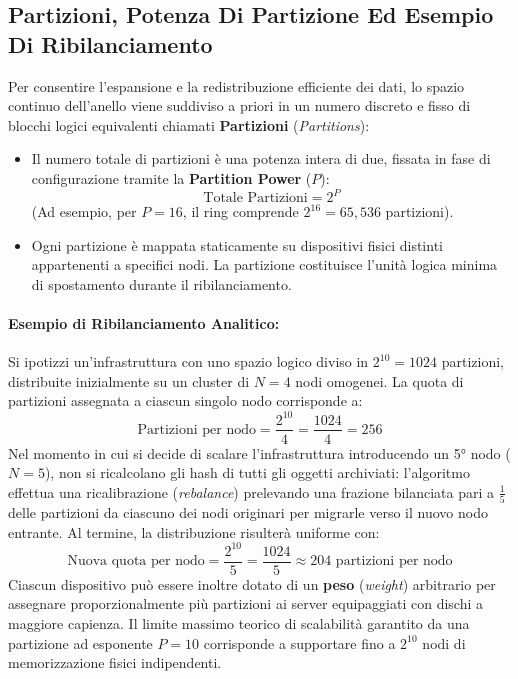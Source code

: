 \documentclass[11pt, a4paper]{article}
\begin{document}
\subsection{Partizioni, Potenza Di Partizione Ed Esempio Di Ribilanciamento}

Per consentire l'espansione e la redistribuzione efficiente dei dati, lo spazio continuo dell'anello viene suddiviso a priori in un numero discreto e fisso di blocchi logici equivalenti chiamati \textbf{Partizioni} (\emph{Partitions}):
\begin{itemize}
    \item Il numero totale di partizioni è una potenza intera di due, fissata in fase di configurazione tramite la \textbf{Partition Power} ($P$):
    \[
        \text{Totale Partizioni} = 2^P
    \]
    (Ad esempio, per $P = 16$, il ring comprende $2^{16} = 65{,}536$ partizioni).
    \item Ogni partizione è mappata staticamente su dispositivi fisici distinti appartenenti a specifici nodi. La partizione costituisce l'unità logica minima di spostamento durante il ribilanciamento.
\end{itemize}

\paragraph{Esempio di Ribilanciamento Analitico:}
Si ipotizzi un'infrastruttura con uno spazio logico diviso in $2^{10} = 1024$ partizioni, distribuite inizialmente su un cluster di $N = 4$ nodi omogenei.
La quota di partizioni assegnata a ciascun singolo nodo corrisponde a:
\[
    \text{Partizioni per nodo} = \frac{2^{10}}{4} = \frac{1024}{4} = 256
\]
Nel momento in cui si decide di scalare l'infrastruttura introducendo un 5° nodo ($N=5$), non si ricalcolano gli hash di tutti gli oggetti archiviati: l'algoritmo effettua una ricalibrazione (\emph{rebalance}) prelevando una frazione bilanciata pari a $\frac{1}{5}$ delle partizioni da ciascuno dei nodi originari per migrarle verso il nuovo nodo entrante. Al termine, la distribuzione risulterà uniforme con:
\[
    \text{Nuova quota per nodo} = \frac{2^{10}}{5} = \frac{1024}{5} \approx 204 \text{ partizioni per nodo}
\]
Ciascun dispositivo può essere inoltre dotato di un \textbf{peso} (\emph{weight}) arbitrario per assegnare proporzionalmente più partizioni ai server equipaggiati con dischi a maggiore capienza. Il limite massimo teorico di scalabilità garantito da una partizione ad esponente $P = 10$ corrisponde a supportare fino a $2^{10}$ nodi di memorizzazione fisici indipendenti.
\end{document}
